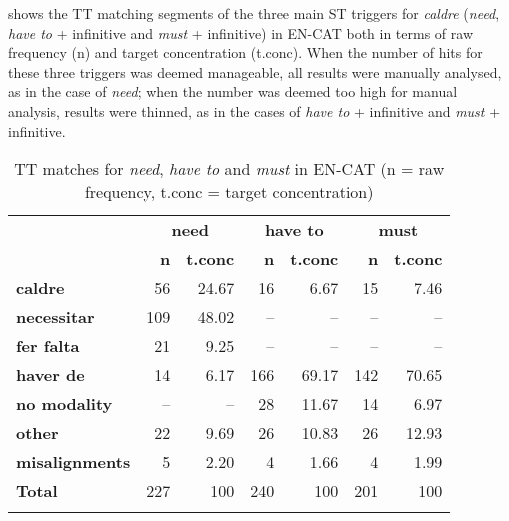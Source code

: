\documentclass[output=paper,english,spanish,german,english]{langsci/langscibook}
\begin{document}
\largerpage
{} shows the TT matching segments of the three main ST triggers for \textit{caldre} (\textit{need}, \textit{have to} + infinitive and \textit{must} + infinitive) in EN-CAT both in terms of raw frequency (n) and target concentration (t.conc). When the number of hits for these three triggers was deemed manageable, all results were manually analysed, as in the case of \textit{need}; when the number was deemed too high for manual analysis, results were thinned, as in the cases of \textit{have to} + infinitive and \textit{must} + infinitive.

\begin{table}[t]
\caption{TT matches for \textit{need}, \textit{have to} and \textit{must} in EN-CAT (n = raw frequency, t.conc = target concentration)}\label{matches}
  \begin{tabularx}{\textwidth}{X rr@{\qquad}rr@{\qquad}rr}
    \lsptoprule
    & \multicolumn{2}{c}{\bfseries need} & \multicolumn{2}{c}{\bfseries have to} & \multicolumn{2}{c}{\bfseries must}\\
    \cmidrule(lr){2-3}\cmidrule(lr){4-5}\cmidrule(lr){6-7}
    & {\bfseries n} & {\bfseries t.conc} & {\bfseries n} & {\bfseries t.conc} & {\bfseries n} & {\bfseries t.conc}\\
    \midrule
    {\bfseries caldre}        & 56  & 24.67 & 16  & 6.67  & 15  & 7.46\\
    {\bfseries necessitar}    & 109 & 48.02 & --  & --    & --  & --\\
    {\bfseries fer falta}     & 21  & 9.25  & --  & --    & --  & --\\
    {\bfseries haver de}      & 14  & 6.17  & 166 & 69.17 & 142 & 70.65\\
    {\bfseries no modality}   & --  & --    & 28  & 11.67 & 14  & 6.97\\
    {\bfseries other}         & 22  & 9.69  & 26  & 10.83 & 26  & 12.93\\
    {\bfseries misalignments} & 5   & 2.20  & 4   & 1.66  & 4   & 1.99\\
    \midrule
    {\bfseries Total}         & 227 & 100   & 240 & 100   & 201 & 100\\
    \lspbottomrule
  \end{tabularx}
\end{table}
\end{document}
